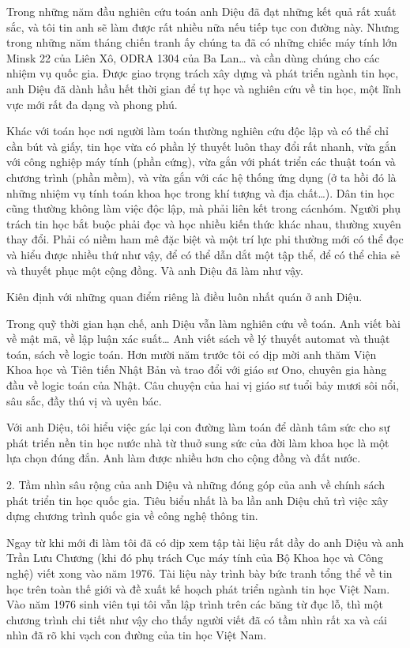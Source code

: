Trong những năm đầu nghiên cứu toán anh Diệu đã đạt những kết quả rất xuất sắc, và tôi tin anh sẽ làm được rất nhiều nữa nếu tiếp tục con đường này. Nhưng trong những năm tháng chiến tranh ấy chúng ta đã có những chiếc máy tính lớn Minsk 22 của Liên Xô, ODRA 1304 của Ba Lan… và cần dùng chúng cho các nhiệm vụ quốc gia. Được giao trọng trách xây dựng và phát triển ngành tin học, anh Diệu đã dành hầu hết thời gian để tự học và nghiên cứu về tin học, một lĩnh vực mới rất đa dạng và phong phú.

Khác với toán học nơi người làm toán thường nghiên cứu độc lập và có thể chỉ cần bút và giấy, tin học vừa có phần lý thuyết luôn thay đổi rất nhanh, vừa gắn với công nghiệp máy tính (phần cứng), vừa gắn với phát triển các thuật toán và chương trình (phần mềm), và vừa gắn với các hệ thống ứng dụng (ở ta hồi đó là những nhiệm vụ tính toán khoa học trong khí tượng và địa chất…). Dân tin học cũng thường không làm việc độc lập, mà phải liên kết trong cácnhóm. Người phụ trách tin học bắt buộc phải đọc và học nhiều kiến thức khác nhau, thường xuyên thay đổi. Phải có niềm ham mê đặc biệt và một trí lực phi thường mới có thể đọc và hiểu được nhiều thứ như vậy, để có thể dẫn dắt một tập thể, để có thể chia sẻ và thuyết phục một cộng đồng. Và anh Diệu đã làm như vậy.

Kiên định với những quan điểm riêng là điều luôn nhất quán ở anh Diệu.

Trong quỹ thời gian hạn chế, anh Diệu vẫn làm nghiên cứu về toán. Anh viết bài về mật mã, về lập luận xác suất… Anh viết sách về lý thuyết automat và thuật toán, sách về logic toán. Hơn mười năm trước tôi có dịp mời anh thăm Viện Khoa học và Tiên tiến Nhật Bản và trao đổi với giáo sư Ono, chuyên gia hàng đầu về logic toán của Nhật. Câu chuyện của hai vị giáo sư tuổi bảy mươi sôi nổi, sâu sắc, đầy thú vị và uyên bác.

Với anh Diệu, tôi hiểu việc gác lại con đường làm toán để dành tâm sức cho sự phát triển nền tin học nước nhà từ thuở sung sức của đời làm khoa học là một lựa chọn đúng đắn. Anh làm được nhiều hơn cho cộng đồng và đất nước.

2. Tầm nhìn sâu rộng của anh Diệu và những đóng góp của anh về chính sách phát triển tin học quốc gia. Tiêu biểu nhất là ba lần anh Diệu chủ trì việc xây dựng chương trình quốc gia về công nghệ thông tin.

Ngay từ khi mới đi làm tôi đã có dịp xem tập tài liệu rất dầy do anh Diệu và anh Trần Lưu Chương (khi đó phụ trách Cục máy tính của Bộ Khoa học và Công nghệ) viết xong vào năm 1976. Tài liệu này trình bày bức tranh tổng thể về tin học trên toàn thế giới và đề xuất kế hoạch phát triển ngành tin học Việt Nam. Vào năm 1976 sinh viên tụi tôi vẫn lập trình trên các băng từ đục lỗ, thì một chương trình chi tiết như vậy cho thấy người viết đã có tầm nhìn rất xa và cái nhìn đã rõ khi vạch con đường của tin học Việt Nam.

